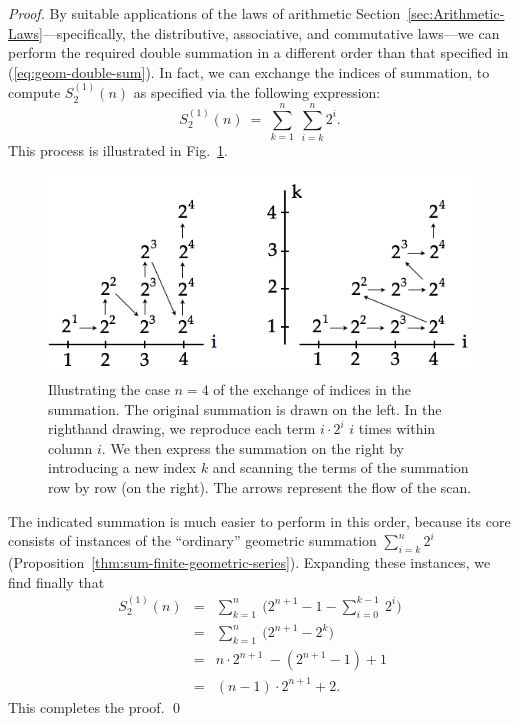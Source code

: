 \begin{proof}
By suitable applications of the laws of arithmetic
Section~\ref{sec:Arithmetic-Laws}---specifically, the distributive,
associative, and commutative laws---we can perform the required double
summation in a different order than that specified in
(\ref{eq:geom-double-sum}).  In fact, we can exchange the indices of
summation, to compute $S_2^{(1)}(n)$ as specified via the following
expression:
\[
S_2^{(1)}(n) \ = \ \sum_{k=1}^{n} \ \sum_{i=k}^{n} 2^i.
\]
This process is illustrated in Fig.~\ref{fig:Sumi2i}.
\begin{figure}[htb]
\centerline{
\includegraphics[scale=0.3]{FiguresMaths/Sumi2i}
}
\caption{Illustrating the case $n=4$ of the exchange of indices in the
  summation.  The original summation is drawn on the left.  In the
  righthand drawing, we reproduce each term $i \cdot 2^i$ $i$ times
  within column $i$.  We then express the summation on the right by
  introducing a new index $k$ and scanning the terms of the summation
  row by row (on the right).  The arrows represent the flow of the
  scan.}
\label{fig:Sumi2i}
\end{figure}
The indicated summation is much easier to perform in this order,
because its core consists of instances of the ``ordinary'' geometric
summation $\sum_{i=k}^{n} 2^i$
(Proposition~\ref{thm:sum-finite-geometric-series}).  Expanding these
instances, we find finally that
\begin{eqnarray*}
S_2^{(1)}(n)
  & = &
\sum_{k=1}^{n} \ \big( 2^{n+1} -1 - \sum_{i=0}^{k-1} \ 2^i \big) \\
  & = &
\sum_{k=1}^{n} \ \big( 2^{n+1} - 2^k \big) \\
  & = &
n \cdot 2^{n+1}\ - ( 2^{n+1} -1) +1 \\
  & = &
(n-1) \cdot 2^{n+1} +2.
\end{eqnarray*}
This completes the proof.  \qed
\end{proof}



